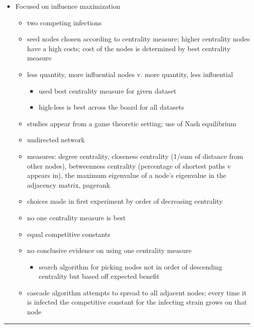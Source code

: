 \documentclass[11pt]{article}
\begin{document}
\begin{itemize}
\item Focused on influence maximization
  \begin{itemize}
     \item two competing infections
     \item seed nodes chosen according to centrality measure; 
           higher centrality nodes have a high costs; 
           cost of the nodes is determined by best centrality measure
    \item less quantity, more influential nodes v. more quantity, less influential
        \begin{itemize}
	   \item used best centrality measure for given dataset
	   \item high-less is best across the board for all datasets
        \end{itemize}
	\item studies appear from a game theoretic setting; use of Nash equilibrium
	\item undirected network
	\item measures: degree centrality, closeness centrality
	(1/sum of distance from other nodes), betweenness centrality
	(percentage of shortest paths v appears in), the maximum
	eigenvalue of a node’s eigenvalue in the adjacency matrix,
	pagerank
	\item choices made in first experiment by order of decreasing centrality
	\item no one centrality measure is best
	\item equal competitive constants
	\item no conclusive evidence on using one centrality measure
            \begin{itemize}
		\item search algorithm for picking nodes not in
		order of descending centrality but based off expected
		benefit
            \end{itemize}
	\item cascade algorithm attempts to spread to all adjacent
	nodes; every time it is infected the competitive constant
	for the infecting strain grows on that node
   \end{itemize}
\end{itemize}

\smallskip

\noindent
\rule{\textwidth}{0.01in}
\end{document}
